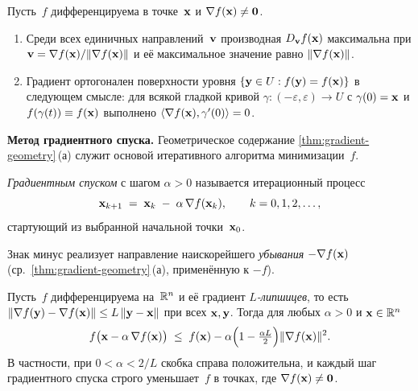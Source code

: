 \begin{theorem}
\label{thm:gradient-geometry}
Пусть~$f$ дифференцируема в точке~$\mathbf{x}$ и $\nabla f(\mathbf{x}) \neq \mathbf{0}$.
\begin{enumerate}[label=(\alph*)]
  \item Среди всех единичных направлений~$\mathbf{v}$ производная
        $D_{\mathbf{v}} f(\mathbf{x})$ максимальна при
        $\mathbf{v} = \nabla f(\mathbf{x}) / \|\nabla f(\mathbf{x})\|$ и
        её максимальное значение равно $\|\nabla f(\mathbf{x})\|$.
  \item Градиент ортогонален поверхности уровня
        $\{\mathbf{y} \in U : f(\mathbf{y}) = f(\mathbf{x})\}$ в следующем
        смысле: для всякой гладкой кривой
        $\gamma \colon (-\varepsilon, \varepsilon) \to U$ с
        $\gamma(0) = \mathbf{x}$ и $f(\gamma(t)) \equiv f(\mathbf{x})$
        выполнено $\langle \nabla f(\mathbf{x}), \gamma'(0) \rangle = 0$.
\end{enumerate}
\end{theorem}

\medskip

\noindent\textbf{Метод градиентного спуска.} Геометрическое
содержание \cref{thm:gradient-geometry}\,(а) служит основой
итеративного алгоритма минимизации~$f$.

\begin{definition}
\label{def:gradient-descent}
\emph{Градиентным спуском} с шагом $\alpha > 0$ называется
итерационный процесс
\[
  \mathbf{x}_{k+1} \;=\; \mathbf{x}_k \;-\; \alpha\, \nabla f(\mathbf{x}_k),
  \qquad k = 0, 1, 2, \dots,
\]
стартующий из выбранной начальной точки~$\mathbf{x}_0$.
\end{definition}

Знак минус реализует направление наискорейшего \emph{убывания}
$-\nabla f(\mathbf{x})$ (ср.\ \cref{thm:gradient-geometry}\,(а),
применённую к $-f$).

\begin{theorem}
\label{thm:gd-descent}
Пусть~$f$ дифференцируема на~$\mathbb{R}^n$ и её градиент
\emph{$L$-липшицев}, то есть
$\|\nabla f(\mathbf{y}) - \nabla f(\mathbf{x})\| \le L\,\|\mathbf{y} - \mathbf{x}\|$
при всех $\mathbf{x}, \mathbf{y}$. Тогда для любых $\alpha > 0$ и
$\mathbf{x} \in \mathbb{R}^n$
\[
  f\bigl(\mathbf{x} - \alpha\, \nabla f(\mathbf{x})\bigr)
  \;\le\; f(\mathbf{x}) - \alpha\Bigl(1 - \tfrac{\alpha L}{2}\Bigr) \|\nabla f(\mathbf{x})\|^2.
\]
В частности, при $0 < \alpha < 2/L$ скобка справа положительна, и
каждый шаг градиентного спуска строго уменьшает~$f$ в точках, где
$\nabla f(\mathbf{x}) \neq \mathbf{0}$.
\end{theorem}

